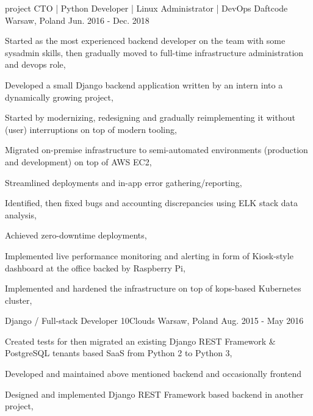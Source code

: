 \begin{cventries}
    \cventry
    {project CTO | Python Developer | Linux Administrator | DevOps} %
    {Daftcode} %
    {Warsaw, Poland} %
    {Jun. 2016 - Dec. 2018} %
    {
        \begin{cvitems} %
            \item {Started as the most experienced backend developer on the team with some sysadmin skills, then gradually moved to full-time infrastructure administration and devops role,}
            \item {Developed a small Django backend application written by an intern into a dynamically growing project,}
            \item {Started by modernizing, redesigning and gradually reimplementing it without (user) interruptions on top of modern tooling,}
            \item {Migrated on-premise infrastructure to semi-automated environments (production and development) on top of AWS EC2,}
            \item {Streamlined deployments and in-app error gathering/reporting,}
            \item {Identified, then fixed bugs and accounting discrepancies using ELK stack data analysis,}
            \item {Achieved zero-downtime deployments,}
            \item {Implemented live performance monitoring and alerting in form of Kiosk-style dashboard at the office backed by Raspberry Pi,}
            \item {Implemented and hardened the infrastructure on top of kops-based Kubernetes cluster,}
        \end{cvitems}
    }

    \cventry
    {Django / Full-stack Developer} %
    {10Clouds} %
    {Warsaw, Poland} %
    {Aug. 2015 - May 2016} %
    {
        \begin{cvitems} %
            \item {Created tests for then migrated an existing Django REST Framework \& PostgreSQL tenants based SaaS from Python 2 to Python 3,}
            \item {Developed and maintained above mentioned backend and occasionally frontend}
            \item {Designed and implemented Django REST Framework based backend in another project,}
        \end{cvitems}
    }



\end{cventries}
